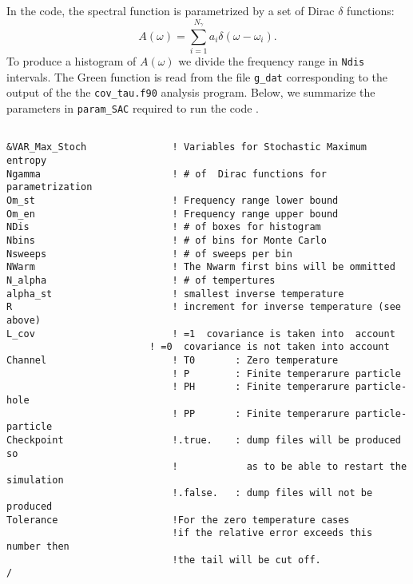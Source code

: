 In the code, the spectral function is parametrized  by a  set of Dirac $\delta$ functions: 
\begin{equation}
      A(\omega)  = \sum_{i=1}^{N_{\gamma}} a_{i} \delta \left( \omega - \omega_i \right).
\end{equation}
To produce a histogram of  $ A(\omega) $ we divide  the frequency range in \texttt{Ndis} intervals. 
The Green function is read from the file \texttt{g\_dat}  corresponding to the  output of the the  \texttt{cov\_tau.f90} analysis program.  
Below, we summarize the  parameters   in   \texttt{param\_SAC}  required  to run the code .  
\lstset{style=fortran}
\begin{lstlisting} 

&VAR_Max_Stoch               ! Variables for Stochastic Maximum entropy
Ngamma                       ! # of  Dirac functions for parametrization
Om_st                        ! Frequency range lower bound
Om_en                        ! Frequency range upper bound
NDis                         ! # of boxes for histogram
Nbins                        ! # of bins for Monte Carlo
Nsweeps                      ! # of sweeps per bin
NWarm                        ! The Nwarm first bins will be ommitted
N_alpha                      ! # of tempertures
alpha_st                     ! smallest inverse temperature
R                            ! increment for inverse temperature (see above) 
L_cov                        ! =1  covariance is taken into  account
	                     ! =0  covariance is not taken into account
Channel                      ! T0       : Zero temperature
                             ! P        : Finite temperarure particle 
                             ! PH       : Finite temperarure particle-hole
                             ! PP       : Finite temperarure particle-particle 
Checkpoint                   !.true.    : dump files will be produced so  
                             !            as to be able to restart the simulation
                             !.false.   : dump files will not be produced 
Tolerance                    !For the zero temperature cases
                             !if the relative error exceeds this number then 
                             !the tail will be cut off. 
/
\end{lstlisting}


